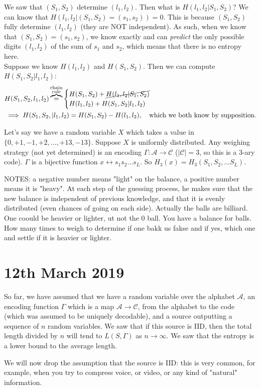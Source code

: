 \documentclass{report}
\begin{document}
 \begin{exmp}[continuation]
 	We saw that $(S_1, S_2)$ determine $(l_1, l_2)$. Then what is $H(l_1, l_2 | S_1, S_2)$? We can know that $H(l_1, l_2 | (S_1, S_2) = (s_1, s_2)) = 0$. This is because $(S_1, S_2)$ fully determine $(l_1, l_2)$ (they are NOT independent). As such, when we know that $(S_1, S_2) = (s_1, s_2)$, we know exactly and can \emph{predict} the only possible digits $(l_1, l_2)$ of the sum of $s_1$ and $s_2$, which means that there is no entropy here. \\
 	Suppose we know $H(l_1, l_2)$ and $H(S_1, S_2)$. Then we can compute $H(S_1, S_2 | l_1, l_2)$:
 	\begin{align*}
 		&H(S_1, S_2, l_1, l_2) \overbrace{=}^{\substack{\text{chain} \\ \text{rule}}} \begin{cases} H(S_1, S_2) + \cancel{H(l_1, l_2 | S_1, S_2)} \\
 													  H(l_1, l_2) + H(S_1, S_2 | l_1, l_2)
 													  \end{cases} \\
		&\implies H(S_1, S_2, | l_1, l_2) = H(S_1, S_2) - H(l_1, l_2), \quad \text{which we both know by supposition.}
 	\end{align*}
 \end{exmp}
 
 \begin{exmp}
 	Let's say we have a random variable $X$ which takes a value in $\{0, +1, -1, +2, \ldots, +13, -13\}$. Suppose $X$ is uniformly distributed. Any weighing strategy (not yet determined) is an encoding $\Gamma: \mathcal A \to \mathcal C$ ($|\mathcal C| = 3$, so this is a $3$-ary code). $\Gamma$ is a bijective function $x \leftrightarrow s_1 s_2\ldots s_L$. So $H_3(x) = H_3(S_1, S_2, \ldots S_L)$.
 \end{exmp}
NOTES: a negative number means "light" on the balance, a positive number means it is "heavy". At each step of the guessing process, he makes sure that the new balance is independent of previous knowledge, and that it is evenly distributed (even chances of going on each side). Actually the balls are billiard.
 One coould be heavier or lighter, ut not the 0 ball. You have a balance for balls. How many times to weigh to determine if one bakk us fakse and if yes, which one and settle if it is heavier or lighter.

\section{12th March 2019}
So far, we have assumed that we have a random variable over the alphabet $\mathcal A$, an encoding function $\Gamma$ which is a map $\mathcal A \to \mathcal C$, from the alphabet to the code (which was assumed to be uniquely decodable), and a source outputting a sequence of $n$ random variables. We saw that if this source is IID, then the total length divided by $n$ will tend to $L(S, \Gamma)$ as $n \to \infty$. We saw that the entropy is a lower bound to the average length. \par
We will now drop the assumption that the source is IID: this is very common, for example, when you try to compress voice, or video, or any kind of "natural" information. 
\end{document}

